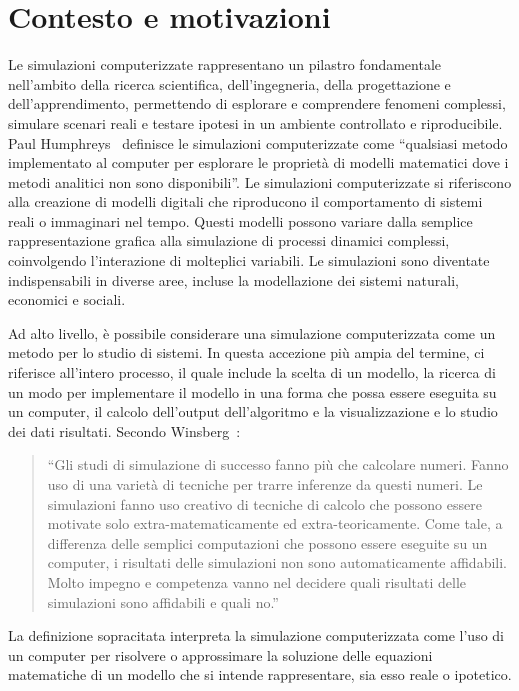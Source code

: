 \documentclass[12pt,a4paper,openright,twoside]{book}
\begin{document}
\section{Contesto e motivazioni}
Le simulazioni computerizzate rappresentano un pilastro fondamentale nell'ambito della ricerca scientifica, dell'ingegneria, della progettazione e dell'apprendimento, permettendo di esplorare e comprendere fenomeni complessi, simulare scenari reali e testare ipotesi in un ambiente controllato e riproducibile. 
Paul Humphreys~\cite{Humphreys1990-HUMCS} definisce le simulazioni computerizzate come ``qualsiasi metodo implementato al computer per esplorare le proprietà di modelli matematici dove i metodi analitici non sono disponibili''. 
Le simulazioni computerizzate si riferiscono alla creazione di modelli digitali che riproducono il comportamento di sistemi reali o immaginari nel tempo. Questi modelli possono variare dalla semplice rappresentazione grafica alla simulazione di processi dinamici complessi, coinvolgendo l'interazione di molteplici variabili. 
Le simulazioni sono diventate indispensabili in diverse aree, incluse la modellazione dei sistemi naturali, economici e sociali. 

Ad alto livello, è possibile considerare una simulazione computerizzata come un metodo per lo studio di sistemi. In questa accezione più ampia del termine, ci riferisce all'intero processo, il quale include la scelta di un modello, la ricerca di un modo per implementare il modello in una forma che possa essere eseguita su un computer, il calcolo dell'output dell'algoritmo e la visualizzazione e lo studio dei dati risultati. Secondo Winsberg~\cite{Winsberg_2003}: 
\begin{quotation}
    ``Gli studi di simulazione di successo fanno più che calcolare numeri. Fanno uso di una varietà di tecniche per trarre inferenze da questi numeri. Le simulazioni fanno uso creativo di tecniche di calcolo che possono essere motivate solo extra-matematicamente ed extra-teoricamente. Come tale, a differenza delle semplici computazioni che possono essere eseguite su un computer, i risultati delle simulazioni non sono automaticamente affidabili. Molto impegno e competenza vanno nel decidere quali risultati delle simulazioni sono affidabili e quali no.''
\end{quotation}
La definizione sopracitata interpreta la simulazione computerizzata come l'uso di un computer per risolvere o approssimare la soluzione delle equazioni matematiche di un modello che si intende rappresentare, sia esso reale o ipotetico. 
\end{document}

